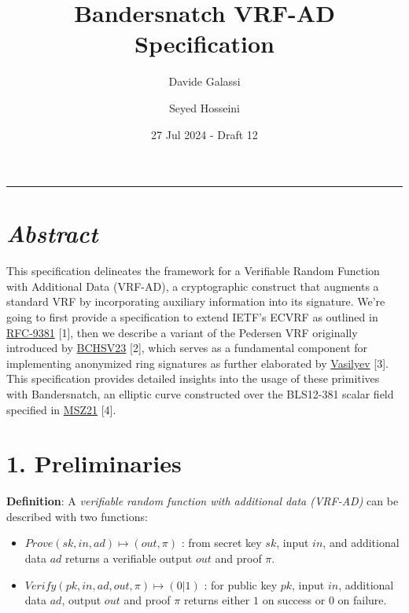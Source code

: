 \documentclass[
]{article}
\title{Bandersnatch VRF-AD Specification}
\author{Davide Galassi \and Seyed Hosseini}
\date{27 Jul 2024 - Draft 12}
\begin{document}
\maketitle

\newcommand{\G}{\langle G \rangle}
\newcommand{\F}{\mathbb{Z}^*_r}

\begin{center}\rule{0.5\linewidth}{0.5pt}\end{center}

\hypertarget{abstract}{%
\section{\texorpdfstring{\emph{Abstract}}{Abstract}}\label{abstract}}

This specification delineates the framework for a Verifiable Random
Function with Additional Data (VRF-AD), a cryptographic construct that
augments a standard VRF by incorporating auxiliary information into its
signature. We're going to first provide a specification to extend IETF's
ECVRF as outlined in
\href{https://datatracker.ietf.org/doc/rfc9381}{RFC-9381} {[}1{]}, then
we describe a variant of the Pedersen VRF originally introduced by
\href{https://eprint.iacr.org/2023/002}{BCHSV23} {[}2{]}, which serves
as a fundamental component for implementing anonymized ring signatures
as further elaborated by
\href{https://hackmd.io/ulW5nFFpTwClHsD0kusJAA}{Vasilyev} {[}3{]}. This
specification provides detailed insights into the usage of these
primitives with Bandersnatch, an elliptic curve constructed over the
BLS12-381 scalar field specified in
\href{https://eprint.iacr.org/2021/1152}{MSZ21} {[}4{]}.

\hypertarget{preliminaries}{%
\section{1. Preliminaries}\label{preliminaries}}

\textbf{Definition}: A \emph{verifiable random function with additional
data (VRF-AD)} can be described with two functions:

\begin{itemize}
\item
  \(Prove(sk,in,ad) \mapsto (out,\pi)\) : from secret key \(sk\), input
  \(in\), and additional data \(ad\) returns a verifiable output \(out\)
  and proof \(\pi\).
\item
  \(Verify(pk,in,ad,out,\pi) \mapsto (0|1)\) : for public key \(pk\),
  input \(in\), additional data \(ad\), output \(out\) and proof \(\pi\)
  returns either \(1\) on success or \(0\) on failure.
\end{itemize}
\end{document}
